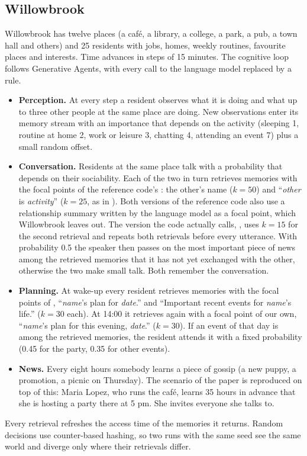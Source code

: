 \subsection{Willowbrook}

Willowbrook has twelve places (a café, a library, a college, a park, a pub, a town hall and others) and 25 residents with jobs, homes, weekly routines, favourite places and interests. Time advances in steps of 15 minutes. The cognitive loop follows Generative Agents, with every call to the language model replaced by a rule.
\begin{itemize}
\item \textbf{Perception.} At every step a resident observes what it is doing and what up to three other people at the same place are doing. New observations enter its memory stream with an importance that depends on the activity (sleeping 1, routine at home 2, work or leisure 3, chatting 4, attending an event 7) plus a small random offset.
\item \textbf{Conversation.} Residents at the same place talk with a probability that depends on their sociability. Each of the two in turn retrieves memories with the focal points of the reference code's : the other's name ($k=50$) and ``\emph{other} is \emph{activity}'' ($k=25$, as in ). Both versions of the reference code also use a relationship summary written by the language model as a focal point, which Willowbrook leaves out. The version the code actually calls, , uses $k=15$ for the second retrieval and repeats both retrievals before every utterance. With probability 0.5 the speaker then passes on the most important piece of news among the retrieved memories that it has not yet exchanged with the other, otherwise the two make small talk. Both remember the conversation.
\item \textbf{Planning.} At wake-up every resident retrieves memories with the focal points of , ``\emph{name}'s plan for \emph{date}.'' and ``Important recent events for \emph{name}'s life.'' ($k=30$ each). At 14:00 it retrieves again with a focal point of our own, ``\emph{name}'s plan for this evening, \emph{date}.'' ($k=30$). If an event of that day is among the retrieved memories, the resident attends it with a fixed probability (0.45 for the party, 0.35 for other events).
\item \textbf{News.} Every eight hours somebody learns a piece of gossip (a new puppy, a promotion, a picnic on Thursday). The scenario of the paper is reproduced on top of this: Maria Lopez, who runs the café, learns 35 hours in advance that she is hosting a party there at 5 pm. She invites everyone she talks to.
\end{itemize}
Every retrieval refreshes the access time of the memories it returns. Random decisions use counter-based hashing, so two runs with the same seed see the same world and diverge only where their retrievals differ.


